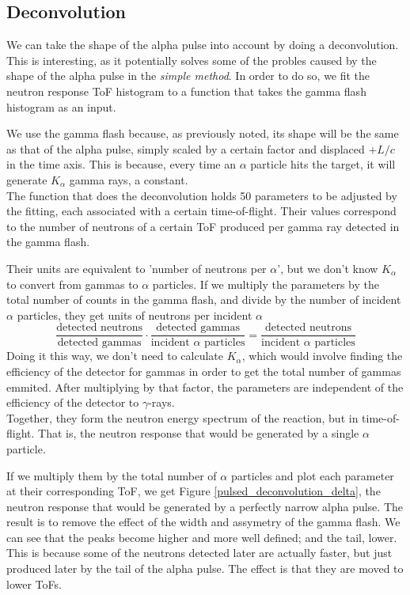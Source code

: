 \documentclass[a4paper,12pt]{report}
\begin{document}
\subsection{Deconvolution}
We can take the shape of the alpha pulse into account by doing a deconvolution.
This is interesting, as it potentially solves some of the probles caused by the shape of the alpha pulse in the \textit{simple method}.
In order to do so, we fit the neutron response ToF histogram to a function that takes the gamma flash histogram as an input.

We use the gamma flash because, as previously noted, its shape will be the same as that of the alpha pulse, simply scaled by a certain factor and displaced $+L/c$ in the time axis.
This is because, every time an $\alpha$ particle hits the target, it will generate $K_\alpha$ gamma rays, a constant.
\\

The function that does the deconvolution holds \num{50} parameters to be adjusted by the fitting, each associated with a certain time-of-flight.
Their values correspond to the number of neutrons of a certain ToF produced per gamma ray detected in the gamma flash.

Their units are equivalent to 'number of neutrons per $\alpha$', but we don't know $K_\alpha$ to convert from gammas to $\alpha$ particles.
If we multiply the parameters by the total number of counts in the gamma flash, and divide by the number of incident $\alpha$ particles, they get units of neutrons per incident $\alpha$
\begin{equation}
	\frac{\text{detected neutrons}}{\text{detected gammas}}\cdot \frac{\text{detected gammas}}{\text{incident $\alpha$ particles}} = \frac{\text{detected neutrons}}{\text{incident $\alpha$ particles}}
\end{equation}
Doing it this way, we don't need to calculate $K_\alpha$, which would involve finding the efficiency of the detector for gammas in order to get the total number of gammas emmited.
After multiplying by that factor, the parameters are independent of the efficiency of the detector to $\gamma$-rays.
\\

Together, they form the neutron energy spectrum of the reaction, but in time-of-flight.
That is, the neutron response that would be generated by a single $\alpha$ particle.

If we multiply them by the total number of $\alpha$ particles and plot each parameter at their corresponding ToF, we get Figure \ref{pulsed_deconvolution_delta}, the neutron response that would be generated by a perfectly narrow alpha pulse.
The result is to remove the effect of the width and assymetry of the gamma flash.
We can see that the peaks become higher and more well defined; and the tail, lower.
This is because some of the neutrons detected later are actually faster, but just produced later by the tail of the alpha pulse.
The effect is that they are moved to lower ToFs.
\end{document}
